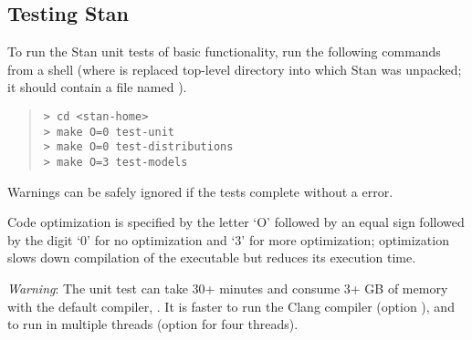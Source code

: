 \subsection{Testing Stan}

To run the Stan unit tests of basic functionality, run the
following commands from a shell (where  is replaced
top-level directory into which Stan was unpacked; it should contain a
file named ).
%
\begin{quote}
\begin{Verbatim}[fontshape=sl]
> cd <stan-home>
> make O=0 test-unit
> make O=0 test-distributions
> make O=3 test-models
\end{Verbatim}
\end{quote}
%
Warnings can be safely ignored if the tests complete without a
 error.

Code optimization is specified by the letter `O' followed by an equal
sign followed by the digit `0' for no optimization and `3' for more
optimization; optimization slows down compilation of the executable
but reduces its execution time.

\emph{Warning}: The unit test can take 30+ minutes and consume 3+ GB
of memory with the default compiler, .  It is faster
to run the Clang compiler (option ), and to run in
multiple threads (option  for four threads).


